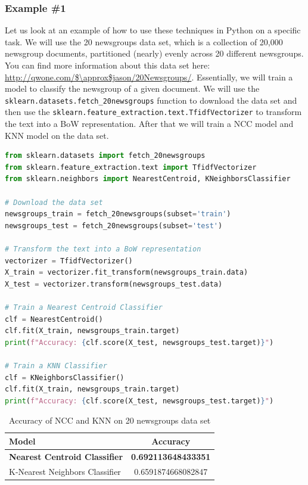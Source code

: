 \subsubsection{Example \#1}
Let us look at an example of how to use these techniques in Python on a specific task.
We will use the 20 newsgroups data set, which is a collection of 20,000 newsgroup documents, partitioned (nearly) evenly across 20 different newsgroups.
You can find more information about this data set here: \url{http://qwone.com/$\approx$jason/20Newsgroups/}.
Essentially, we will train a model to classify the newsgroup of a given document.
We will use the \lstinline{sklearn.datasets.fetch_20newsgroups} function to download the data set and then use the \lstinline{sklearn.feature_extraction.text.TfidfVectorizer}
to transform the text into a BoW representation.
After that we will train a NCC model and KNN model on the data set.
\begin{lstlisting}[language=Python, caption={20 newsgroups example}, label={code:20-newsgroups}]
from sklearn.datasets import fetch_20newsgroups
from sklearn.feature_extraction.text import TfidfVectorizer
from sklearn.neighbors import NearestCentroid, KNeighborsClassifier

# Download the data set
newsgroups_train = fetch_20newsgroups(subset='train')
newsgroups_test = fetch_20newsgroups(subset='test')

# Transform the text into a BoW representation
vectorizer = TfidfVectorizer()
X_train = vectorizer.fit_transform(newsgroups_train.data)
X_test = vectorizer.transform(newsgroups_test.data)

# Train a Nearest Centroid Classifier
clf = NearestCentroid()
clf.fit(X_train, newsgroups_train.target)
print(f"Accuracy: {clf.score(X_test, newsgroups_test.target)}")

# Train a KNN Classifier
clf = KNeighborsClassifier()
clf.fit(X_train, newsgroups_train.target)
print(f"Accuracy: {clf.score(X_test, newsgroups_test.target)}")
\end{lstlisting}

\begin{table}[h]
  \centering
  \begin{tabular}{|l|c|}
    \hline
    \textbf{Model} & \textbf{Accuracy} \\
    \hline
    \textbf{Nearest Centroid Classifier} & \textbf{0.692113648433351}\\
    K-Nearest Neighbors Classifier & 0.6591874668082847\\
    \hline
  \end{tabular}
  \caption{Accuracy of NCC and KNN on 20 newsgroups data set}
  \label{tab:20-newsgroups}
\end{table}

